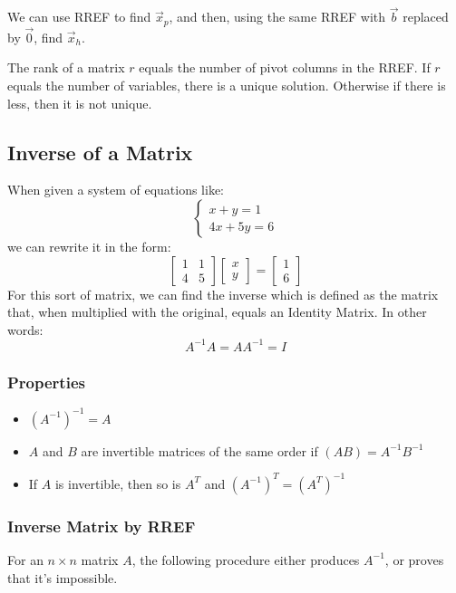     We can use RREF to find $\vec{x}_p$, and then, using the same RREF with $\vec{b}$ replaced by $\vec{0}$, find $\vec{x}_h$.

    The rank of a matrix $r$ equals the number of pivot columns in the RREF. If $r$ equals the number of variables, there is a unique solution. Otherwise if there is less, then it is not unique.

    \subsection{Inverse of a Matrix}
    When given a system of equations like:
    \[
        \begin{cases}
            x + y = 1\\
            4x + 5y = 6
        \end{cases}
    \]
    we can rewrite it in the form:
    \[
        \left[\begin{array}{cc}
        1 & 1\\
        4 & 5
        \end{array}\right]
        \left[\begin{array}{c}
            x\\
            y
        \end{array}\right] =
        \left[\begin{array}{c}
            1\\
            6
        \end{array}\right]
    \]
    For this sort of matrix, we can find the inverse which is defined as the matrix that, when multiplied with the original, equals an Identity Matrix. In other words:
    \[ A^{-1}A = AA^{-1} = I \]

        \subsubsection{Properties}
        \begin{itemize}
        \item ${( A^{-1})}^{-1} = A$
        \item $A$ and $B$ are invertible matrices of the same order if $\left(AB\right) = A^{-1}B^{-1}$
        \item If $A$ is invertible, then so is $A^T$ and $\left(A^{-1}\right)^T = \left(A^T\right)^{-1}$
        \end{itemize}

        \subsubsection{Inverse Matrix by RREF}
        For an $n\times n$ matrix $A$, the following procedure either produces $A^{-1}$, or proves that it's impossible.

